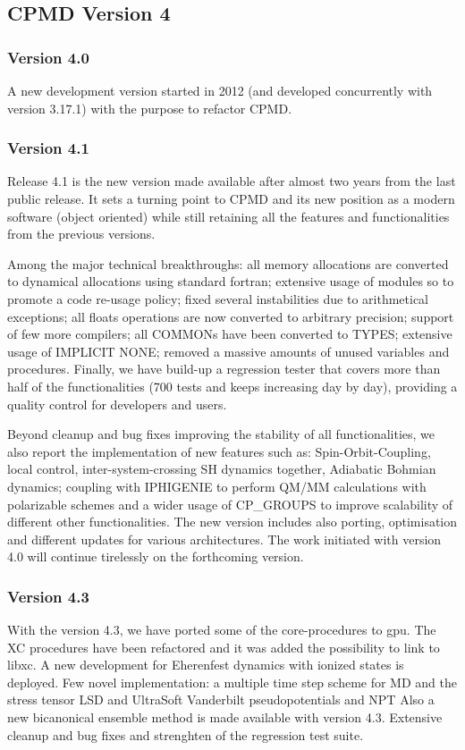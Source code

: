 \documentclass[twoside,10pt,titlepage,a4paper]{article}
\begin{document}
\subsection{CPMD Version 4}

\subsubsection{Version 4.0}
%
A new development version started in 2012 (and developed concurrently with
version 3.17.1) with the purpose to refactor CPMD.


\subsubsection{Version 4.1} 
%
Release 4.1 is the new version made available after almost two years from the
last public release.
%
It sets a turning point to CPMD and its new position as a modern software
(object oriented) while still retaining all the features and functionalities
from the previous versions.


Among the major technical breakthroughs: all memory allocations are converted
to dynamical allocations using standard fortran; extensive usage of modules so
to promote a code re-usage policy; fixed several instabilities due to
arithmetical exceptions;  all floats operations are now converted to arbitrary
precision; support of few more compilers; all COMMONs have been converted to
TYPES; extensive usage of IMPLICIT NONE; removed a massive amounts of unused
variables and procedures. Finally, we have build-up a regression tester that
covers more than half of the functionalities (700 tests and keeps increasing
day by day), providing a quality control for developers and users.


Beyond cleanup and bug fixes improving the stability of all functionalities, we
also report the implementation of new features such as: Spin-Orbit-Coupling,
local control, inter-system-crossing SH dynamics together, Adiabatic Bohmian
dynamics; coupling with IPHIGENIE to perform QM/MM calculations with
polarizable schemes and a wider usage of CP\_GROUPS to improve scalability of
different other functionalities.  The new version includes also porting,
optimisation and different updates for various architectures. The work
initiated with version 4.0 will continue tirelessly on the forthcoming version.

\subsubsection{Version 4.3} 
%
With the version 4.3, we have ported some of the core-procedures to gpu. The XC procedures
have been refactored and it was added the possibility to link to libxc.
A new development for Eherenfest dynamics with ionized states is deployed.
Few novel implementation: a multiple time step scheme for MD and the stress tensor LSD and UltraSoft Vanderbilt pseudopotentials and NPT
Also a new bicanonical ensemble method is made available with version 4.3.
Extensive cleanup and bug fixes and strenghten of the regression test suite.
\end{document}
